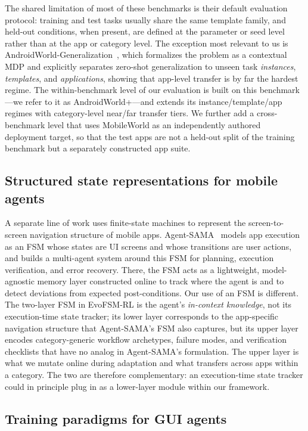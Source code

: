 The shared limitation of most of these benchmarks is their default evaluation
protocol: training and test tasks usually share the same template family, and
held-out conditions, when present, are defined at the parameter or seed level
rather than at the app or category level. The exception most relevant to us is
AndroidWorld-Generalization~\citep{gu2026generalization}, which formalizes the
problem as a contextual MDP and explicitly separates zero-shot generalization to
unseen task \emph{instances}, \emph{templates}, and \emph{applications}, showing
that app-level transfer is by far the hardest regime. The within-benchmark level
of our evaluation is built on this benchmark---we refer to it as
AndroidWorld+---and extends its instance/template/app regimes with category-level
near/far transfer tiers. We further add a cross-benchmark level that uses
MobileWorld as an independently authored deployment target, so that the test apps
are not a held-out split of the training benchmark but a separately constructed
app suite.

\subsection{Structured state representations for mobile agents}

A separate line of work uses finite-state machines to represent the
screen-to-screen navigation structure of mobile apps.
Agent-SAMA~\citep{guo2025agentsama} models app execution as an FSM whose states
are UI screens and whose transitions are user actions, and builds a multi-agent
system around this FSM for planning, execution verification, and error recovery.
There, the FSM acts as a lightweight, model-agnostic memory layer constructed
online to track where the agent is and to detect deviations from expected
post-conditions. Our use of an FSM is different. The two-layer FSM in EvoFSM-RL
is the agent's \emph{in-context knowledge}, not its execution-time state tracker;
its lower layer corresponds to the app-specific navigation structure that
Agent-SAMA's FSM also captures, but its upper layer encodes category-generic
workflow archetypes, failure modes, and verification checklists that have no
analog in Agent-SAMA's formulation. The upper layer is what we mutate online
during adaptation and what transfers across apps within a category. The two are
therefore complementary: an execution-time state tracker could in principle plug
in as a lower-layer module within our framework.

\subsection{Training paradigms for GUI agents}

